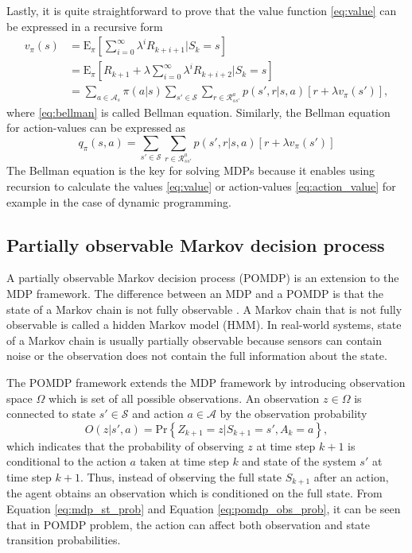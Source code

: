 \documentclass[english, 12pt, a4paper, elec, utf8, a-1b, online]{aaltothesis}
\newcommand{\Epolicy}[1]{\mathrm{E}_\pi \left[ #1 \right]}
\newcommand{\Ss}{\mathcal{S}}
\newcommand{\As}{\mathcal{A}}
\newcommand{\Rs}{\mathcal{R}}
\newcommand{\Os}{\Omega}
\newcommand{\Op}{O}
\renewcommand{\Pr}[1]{\text{Pr}\left\{ #1 \right\}}
\begin{document}
Lastly, it is quite straightforward to prove that the value function \eqref{eq:value} can be expressed in a recursive form 
\begin{align}
    v_\pi(s) 
    &= \Epolicy{ \sum_{i=0}^{\infty} \lambda^i R_{k + i + 1} | S_k=s} \\
    &= \Epolicy{R_{k + 1} + \lambda \sum_{i=0}^{\infty} \lambda^i R_{k + i + 2} | S_k=s} \\
    &= \sum_{a \in \As_s} \pi(a | s) \sum_{s' \in \Ss} \sum_{r \in \Rs_{ss'}^a} p(s', r | s, a) \left[ r + \lambda v_\pi(s') \right]\label{eq:bellman},
\end{align}
where \eqref{eq:bellman} is called Bellman equation.
Similarly, the Bellman equation for action-values can be expressed as 
\begin{equation}\label{eq:bellman_action}
     q_\pi(s, a) = \sum_{s' \in \Ss} \sum_{r \in \Rs_{ss'}^a} p(s', r | s, a) \left[ r + \lambda v_\pi(s') \right]
\end{equation}
The Bellman equation is the key for solving MDPs because it enables using recursion to calculate the values \eqref{eq:value} or action-values \eqref{eq:action_value} for example in the case of dynamic programming.


\subsection{Partially observable Markov decision process} \label{sec:POMDP}


A partially observable Markov decision process (POMDP) is an extension to the MDP framework. 
The difference between an MDP and a POMDP is that the state of a Markov chain is not fully observable \cite{Krishnamurthy2016}.
A Markov chain that is not fully observable is called a hidden Markov model (HMM).
In real-world systems, state of a Markov chain is usually partially observable because sensors can contain noise or the observation does not contain the full information about the state.

The POMDP framework extends the MDP framework by introducing observation space $\Os$ which is set of all possible observations.
An observation $z \in \Os$ is connected to state $s' \in \Ss$ and action $a \in \As$ by the observation probability
\begin{equation}\label{eq:pomdp_obs_prob}
    \Op(z | s', a) = \Pr{Z_{k+1}=z | S_{k+1}=s', A_k=a},
\end{equation}
which indicates that the probability of observing $z$ at time step $k+1$ is conditional to the action $a$ taken at time step $k$ and state of the system $s'$ at time step $k+1$.
Thus, instead of observing the full state $S_{k+1}$ after an action, the agent obtains an observation which is conditioned on the full state.
From Equation \eqref{eq:mdp_st_prob} and Equation \eqref{eq:pomdp_obs_prob}, it can be seen that in POMDP problem, the action can affect both observation and state transition probabilities.
\end{document}
